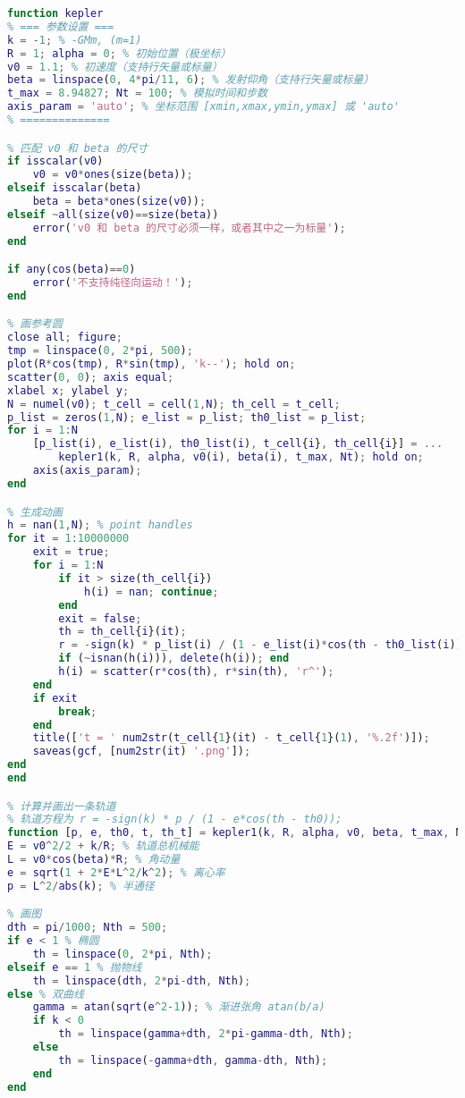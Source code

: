 \begin{lstlisting}[language=matlab,caption=kepler.m]
% 已知初始位置、发射速度、发射方向， 求轨道以及运动方程
function kepler
% === 参数设置 ===
k = -1; % -GMm, (m=1)
R = 1; alpha = 0; % 初始位置（极坐标）
v0 = 1.1; % 初速度（支持行矢量或标量）
beta = linspace(0, 4*pi/11, 6); % 发射仰角（支持行矢量或标量）
t_max = 8.94827; Nt = 100; % 模拟时间和步数
axis_param = 'auto'; % 坐标范围 [xmin,xmax,ymin,ymax] 或 'auto'
% ==============

% 匹配 v0 和 beta 的尺寸
if isscalar(v0)
    v0 = v0*ones(size(beta));
elseif isscalar(beta)
    beta = beta*ones(size(v0));
elseif ~all(size(v0)==size(beta))
    error('v0 和 beta 的尺寸必须一样，或者其中之一为标量');
end

if any(cos(beta)==0)
    error('不支持纯径向运动！');
end

% 画参考圆
close all; figure;
tmp = linspace(0, 2*pi, 500);
plot(R*cos(tmp), R*sin(tmp), 'k--'); hold on;
scatter(0, 0); axis equal;
xlabel x; ylabel y;
N = numel(v0); t_cell = cell(1,N); th_cell = t_cell;
p_list = zeros(1,N); e_list = p_list; th0_list = p_list;
for i = 1:N
    [p_list(i), e_list(i), th0_list(i), t_cell{i}, th_cell{i}] = ...
        kepler1(k, R, alpha, v0(i), beta(i), t_max, Nt); hold on;
    axis(axis_param);
end

% 生成动画
h = nan(1,N); % point handles
for it = 1:10000000
    exit = true;
    for i = 1:N
        if it > size(th_cell{i})
            h(i) = nan; continue;
        end
        exit = false;
        th = th_cell{i}(it);
        r = -sign(k) * p_list(i) / (1 - e_list(i)*cos(th - th0_list(i)));
        if (~isnan(h(i))), delete(h(i)); end
        h(i) = scatter(r*cos(th), r*sin(th), 'r^');
    end
    if exit
        break;
    end
    title(['t = ' num2str(t_cell{1}(it) - t_cell{1}(1), '%.2f')]);
    saveas(gcf, [num2str(it) '.png']);
end
end

% 计算并画出一条轨道
% 轨道方程为 r = -sign(k) * p / (1 - e*cos(th - th0));
function [p, e, th0, t, th_t] = kepler1(k, R, alpha, v0, beta, t_max, Nt)
E = v0^2/2 + k/R; % 轨道总机械能
L = v0*cos(beta)*R; % 角动量
e = sqrt(1 + 2*E*L^2/k^2); % 离心率
p = L^2/abs(k); % 半通径

% 画图
dth = pi/1000; Nth = 500;
if e < 1 % 椭圆
    th = linspace(0, 2*pi, Nth);
elseif e == 1 % 抛物线
    th = linspace(dth, 2*pi-dth, Nth);
else % 双曲线
    gamma = atan(sqrt(e^2-1)); % 渐进张角 atan(b/a)
    if k < 0
        th = linspace(gamma+dth, 2*pi-gamma-dth, Nth);
    else
        th = linspace(-gamma+dth, gamma-dth, Nth);
    end
end


\end{lstlisting}
